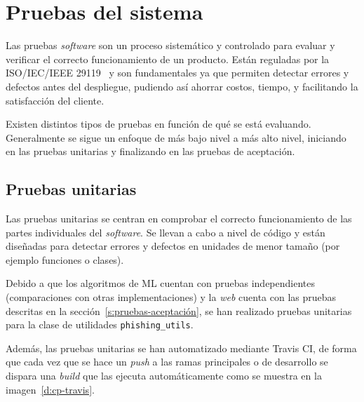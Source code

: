 \section{Pruebas del sistema}
\label{s:pruebas}

Las pruebas \textit{software} son un proceso sistemático y controlado para evaluar y verificar el correcto funcionamiento de un producto. Están reguladas por la ISO/IEC/IEEE 29119~\cite{iso-pruebas} y son fundamentales ya que permiten detectar errores y defectos antes del despliegue, pudiendo así ahorrar costos, tiempo, y facilitando la satisfacción del cliente.

Existen distintos tipos de pruebas en función de qué se está evaluando. Generalmente se sigue un enfoque de más bajo nivel a más alto nivel, iniciando en las pruebas unitarias y finalizando en las pruebas de aceptación.


\subsection{Pruebas unitarias}
\label{s:pruebas-unitarias}

Las pruebas unitarias se centran en comprobar el correcto funcionamiento de las partes individuales del \textit{software}. Se llevan a cabo a nivel de código y están diseñadas para detectar errores y defectos en unidades de menor tamaño (por ejemplo funciones o clases).

Debido a que los algoritmos de ML cuentan con pruebas independientes (comparaciones con otras implementaciones) y la \textit{web} cuenta con las pruebas descritas en la sección~\ref{s:pruebas-aceptación}, se han realizado pruebas unitarias para la clase de utilidades \texttt{phishing\_utils}.

Además, las pruebas unitarias se han automatizado mediante Travis CI, de forma que cada vez que se hace un \textit{push} a las ramas principales o de desarrollo se dispara una \textit{build} que las ejecuta automáticamente como se muestra en la imagen~\ref{d:cp-travis}.

